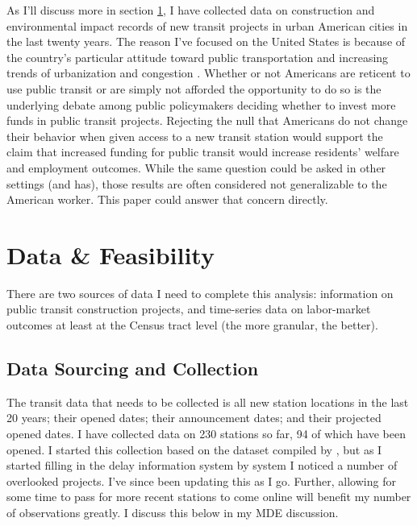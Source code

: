 \documentclass[12pt]{article}
\begin{document}
As I'll discuss more in section \ref{sec:data}, I have collected data on construction and environmental impact records of new transit projects in urban American cities in the last twenty years. The reason I've focused on the United States is because of the country's particular attitude toward public transportation and increasing trends of urbanization and congestion \parencite{roseTrafficCongestionHits2025, fhwa2026ucr}. Whether or not Americans are reticent to use public transit or are simply not afforded the opportunity to do so is the underlying debate among public policymakers deciding whether to invest more funds in public transit projects. Rejecting the null that Americans do not change their behavior when given access to a new transit station would support the claim that increased funding for public transit would increase residents' welfare and employment outcomes. While the same question could be asked in other settings (and has), those results are often considered not generalizable to the American worker. This paper could answer that concern directly. 

\section{Data \& Feasibility}\label{sec:data}
There are two sources of data I need to complete this analysis: information on public transit construction projects, and time-series data on labor-market outcomes at least at the Census tract level (the more granular, the better). 

\subsection{Data Sourcing and Collection}
The transit data that needs to be collected is all new station locations in the last 20 years; their opened dates; their announcement dates; and their projected opened dates. I have collected data on 230 stations so far, 94 of which have been opened. I started this collection based on the dataset compiled by \textcite{levy_2025_9wnjp-kez15}, but as I started filling in the delay information system by system I noticed a number of overlooked projects. I've since been updating this as I go. Further, allowing for some time to pass for more recent stations to come online will benefit my number of observations greatly. I discuss this below in my MDE discussion. 
\end{document}
